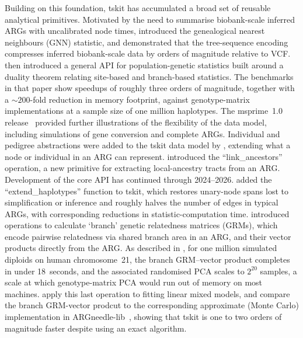 \documentclass{article}
\begin{document}
Building on this foundation, tskit has accumulated a broad set of
reusable analytical primitives.
Motivated by the need to summarise biobank-scale inferred ARGs with
uncalibrated node times, \citet{kelleher2019inferring} introduced the
genealogical nearest neighbours (GNN) statistic, and demonstrated that
the tree-sequence encoding compresses inferred biobank-scale data by
orders of magnitude relative to VCF.
\citet{ralph2020efficiently} then introduced a general API for
population-genetic statistics built around a duality theorem relating
site-based and branch-based statistics. The benchmarks in that paper
show speedups of roughly three orders of magnitude, together with a
$\sim 200$-fold reduction in memory footprint, against genotype-matrix
implementations at a sample size of one million haplotypes.
The msprime~1.0 release~\citep{baumdicker2022efficient} provided
further illustrations of the flexibility of the data model, including
simulations of gene conversion and complete ARGs.
Individual and pedigree abstractions were added to the tskit data
model by \citet{andersontrocme2023genes}, extending what a node or
individual in an ARG can represent.
\citet{tsambos2023link} introduced the ``link\_ancestors'' operation,
a new primitive for extracting local-ancestry tracts from an ARG.
Development of the core API has continued through 2024--2026.
\citet{fritze2026forest} added the ``extend\_haplotypes'' function to
tskit, which restores unary-node spans lost to simplification or
inference and roughly halves the number of edges in typical ARGs, with
corresponding reductions in statistic-computation time. \citet{lehmann2026on} 
introduced operations to calculate `branch' genetic relatedness matrices 
(GRMs), which encode pairwise relatedness via shared branch area in an ARG, and their 
vector products directly from the ARG. As described in \citet{lehmann2026on},
for one million simulated diploids on human chromosome~21, the 
branch GRM--vector product completes in under 18~seconds, and the associated
randomised PCA scales to $2^{20}$ samples, a scale at which genotype-matrix PCA
would run out of memory on most machines.
\citet{lee2026genetic} apply this last operation to fitting linear mixed models,
and compare the branch GRM-vector prodcut to the corresponding approximate (Monte Carlo)
implementation in ARGneedle-lib~\citep{zhang2023biobank}, showing that tskit is
one to two orders of magnitude faster despite using an exact algorithm.
\end{document}
